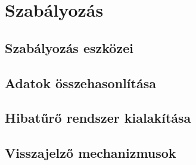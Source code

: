 \chapter{Szabályozás}
\label{sec:Szabalyozas}

\section{Szabályozás eszközei}

\section{Adatok összehasonlítása}

\section{Hibatűrő rendszer kialakítása}

\section{Visszajelző mechanizmusok}
